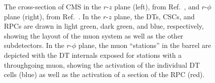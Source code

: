 \begin{figure}[htb]
    \centering
    \quad
    \caption[The cross-section of CMS in the $r$-$z$ plane, from Ref.~\cite{CMS:2018rym}, and $r$-$\phi$ plane, from Ref.~\cite{CMSWebMuons}]{
        The cross-section of CMS in the $r$-$z$ plane (left), from Ref.~\cite{CMS:2018rym}, and $r$-$\phi$ plane (right), from Ref.~\cite{CMSWebMuons}. 
        In the $r$-$z$ plane, the DTs, CSCs, and RPCs are drawn in light green, dark green, and blue, respectively, showing the layout of the muon system as well as the other subdetectors. 
        In the $r$-$\phi$ plane, the muon ``stations'' in the barrel are depicted with the DT internals exposed for stations with a throughgoing muon, showing the activation of the individual DT cells (blue) as well as the activation of a section of the RPC (red).
    }
\end{figure}

